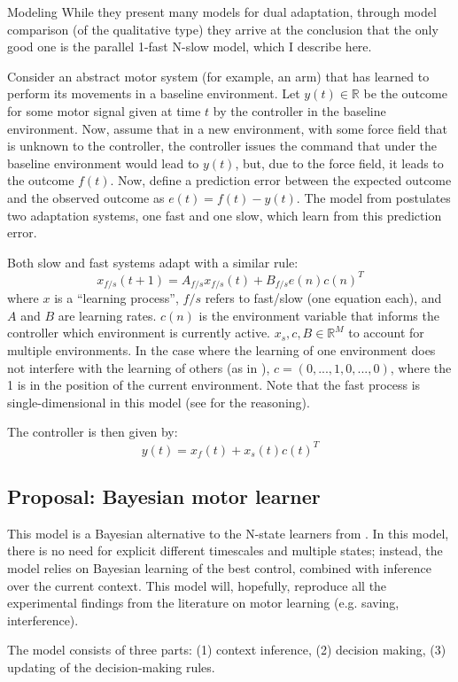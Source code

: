 \documentclass{report}
\begin{document}
\begin{chapter}{Modeling}
While they present many models for dual adaptation, through model comparison (of
the qualitative type) they arrive at the conclusion that the only good one is
the parallel 1-fast N-slow model, which I describe here.

Consider an abstract motor system (for example, an arm) that has learned to
perform its movements in a baseline environment. Let $y(t) \in \mathbb{R}$ be
the outcome for some motor signal given at time $t$ by the controller in the
baseline environment. Now, assume that in a new environment, with some force
field that is unknown to the controller, the controller issues the command that
under the baseline environment would lead to $y(t)$, but, due to the force
field, it leads to the outcome $f(t)$. Now, define a prediction error between
the expected outcome and the observed outcome as $e(t) = f(t) - y(t)$. The model
from \cite{Lee_Dual_2009} postulates two adaptation systems, one fast and one
slow, which learn from this prediction error.

Both slow and fast systems adapt with a similar rule:
\[
x_{f/s}(t + 1) = A_{f/s}x_{f/s}(t) + B_{f/s}e(n)c(n)^T
\]
where $x$ is a ``learning process'', $f/s$ refers to fast/slow (one equation
each), and $A$ and $B$ are learning rates. $c(n)$ is the environment variable
that informs the controller which environment is currently active.
$x_s,c, B \in \mathbb{R}^M$ to account for multiple environments. In the case
where the learning of one environment does not interfere with the learning of
others (as in \cite{Lee_Dual_2009}), $c = (0, ..., 1, 0, ..., 0)$, where the 1
is in the position of the current environment. Note that the fast process is
single-dimensional in this model (see \citep{Lee_Dual_2009} for the reasoning).

The controller is then given by:
\[
y(t) = x_f(t) + x_s(t)c(t)^T
\]

\subsection{Proposal: Bayesian motor learner}
This model is a Bayesian alternative to the N-state learners from
\cite{Lee_Dual_2009}. In this model, there is no need for explicit different
timescales and multiple states; instead, the model relies on Bayesian learning
of the best control, combined with inference over the current context. This
model will, hopefully, reproduce all the experimental findings from the
literature on motor learning (e.g. saving, interference).

The model consists of three parts: (1) context inference, (2) decision making,
(3) updating of the decision-making rules.


\end{chapter}
\end{document}
